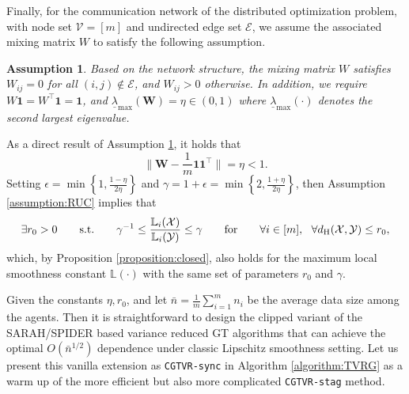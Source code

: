 \documentclass{article}
\newtheorem{assumption}[theorem]{Assumption}
\newcommand{\cX}{\mathcal{X}}
\newcommand{\cY}{\mathcal{Y}}
\newcommand{\bL}{\mathbb{L}}
\begin{document}
Finally, for the communication network of the distributed optimization problem, with node set $\mathcal{V}=[m]$ and undirected edge set $\mathcal{E}$, we assume the associated mixing matrix $W$ to satisfy the following assumption.  
 
\begin{assumption}
\label{assumption:mix-spectral}
Based on the network structure, the mixing matrix $W$ satisfies $W_{ij}=0$ for all $(i,j)\notin\mathcal{E}$, and $W_{ij}>0$ otherwise. In addition, we require $W\mathbf{1}=W^\top\mathbf{1}=\mathbf{1}$,  and $\underline{\lambda}_{\max }(\mathbf{W})=\eta\in(0,1)$ where $\underline{\lambda}_{\max}(\cdot)$ denotes the second largest eigenvalue. 
\end{assumption} 
\noindent As a direct result of Assumption \ref{assumption:mix-spectral}, it holds that
\begin{equation}
    \label{eqn:mix-spectral}
    \Big\|\mathbf{W}-\frac{1}{m} \mathbf{1}\mathbf{1}^\top\Big\| = \eta < 1.
\end{equation}
Setting $\epsilon = \min\left\{1,\frac{1-\eta}{2\eta}\right\}$ and $\gamma = 1+\epsilon = \min\left\{2,\frac{1+\eta}{2\eta}\right\}$, then Assumption \ref{assumption:RUC} implies that 
\begin{equation}
    \label{eqn:ruc-r0}
    \exists r_0>0\qquad\mbox{s.t.}\qquad \gamma^{-1}\leq \frac{\bL_i(\cX)}{\bL_i(\cY)} \leq \gamma\qquad\mbox{for}\qquad\forall i\in[m],\,\,\,\, \forall d_{\rm H}(\cX,\cY)\leq r_0,
\end{equation} 
which, by Proposition \ref{proposition:closed}, also holds for the maximum local smoothness constant $\bL(\cdot)$ with the same set of parameters $r_0$ and $\gamma$. 

Given the constants $\eta,r_0$, and let $\bar{n}=\frac{1}{m}\sum_{i=1}^mn_i$ be the average data size among the agents. Then it is straightforward to design the clipped variant of the SARAH/SPIDER based variance reduced GT algorithms \cite{sun2020improving,xin2020near} that can achieve the optimal $O(\bar{n}^{1/2})$ dependence under classic Lipschitz smoothness setting. Let us present this vanilla extension as \texttt{CGTVR-sync} in Algorithm \ref{algorithm:TVRG} as a warm up of the more efficient but also more complicated \texttt{CGTVR-stag} method.  
\end{document}
